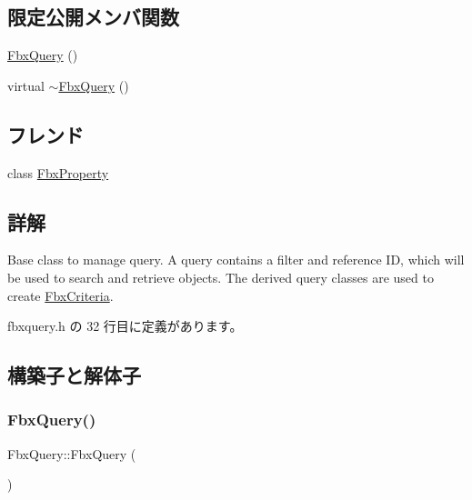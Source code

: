 \subsection*{限定公開メンバ関数}
\begin{DoxyCompactItemize}
\item 
\hyperlink{class_fbx_query_af8e81dde9b528978812388b9dc0d6d60}{Fbx\+Query} ()
\item 
virtual \hyperlink{class_fbx_query_a9e87c2a8fda32a157ed77b998aac954e}{$\sim$\+Fbx\+Query} ()
\end{DoxyCompactItemize}
\subsection*{フレンド}
\begin{DoxyCompactItemize}
\item 
class \hyperlink{class_fbx_query_a5d7018830479ec28905f28575480f88f}{Fbx\+Property}
\end{DoxyCompactItemize}


\subsection{詳解}
Base class to manage query. A query contains a filter and reference ID, which will be used to search and retrieve objects. The derived query classes are used to create \hyperlink{class_fbx_criteria}{Fbx\+Criteria}. 

 fbxquery.\+h の 32 行目に定義があります。



\subsection{構築子と解体子}
\mbox{\label{class_fbx_query_af8e81dde9b528978812388b9dc0d6d60}} 
\subsubsection{\texorpdfstring{Fbx\+Query()}{FbxQuery()}}
{\footnotesize\ttfamily Fbx\+Query\+::\+Fbx\+Query (\begin{DoxyParamCaption}{ }\end{DoxyParamCaption})\hspace{0.3cm}{\ttfamily [protected]}}

\mbox{\label{class_fbx_query_a9e87c2a8fda32a157ed77b998aac954e}} 
